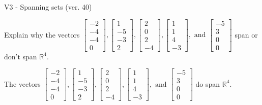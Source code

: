 \begin{exercise}
  \begin{exerciseTitle}V3 - Spanning sets (ver. 40)\end{exerciseTitle}
  \begin{exerciseStatement}
    Explain why the vectors \(\left[\begin{array}{r}
-2 \\
-4 \\
-4 \\
0
\end{array}\right] , \left[\begin{array}{r}
1 \\
-5 \\
-3 \\
2
\end{array}\right] , \left[\begin{array}{r}
2 \\
0 \\
2 \\
-4
\end{array}\right] , \left[\begin{array}{r}
1 \\
1 \\
4 \\
-3
\end{array}\right] , \text{ and } \left[\begin{array}{r}
-5 \\
3 \\
0 \\
0
\end{array}\right]\) span or don't span \(\mathbb{R}^4\). 
	


  \end{exerciseStatement}
  \begin{exerciseAnswer}
   The vectors \(\left[\begin{array}{r}
-2 \\
-4 \\
-4 \\
0
\end{array}\right] , \left[\begin{array}{r}
1 \\
-5 \\
-3 \\
2
\end{array}\right] , \left[\begin{array}{r}
2 \\
0 \\
2 \\
-4
\end{array}\right] , \left[\begin{array}{r}
1 \\
1 \\
4 \\
-3
\end{array}\right] , \text{ and } \left[\begin{array}{r}
-5 \\
3 \\
0 \\
0
\end{array}\right]\) 
  	 do  
	span \(\mathbb{R}^4\).
  



\end{exerciseAnswer}
\end{exercise}
